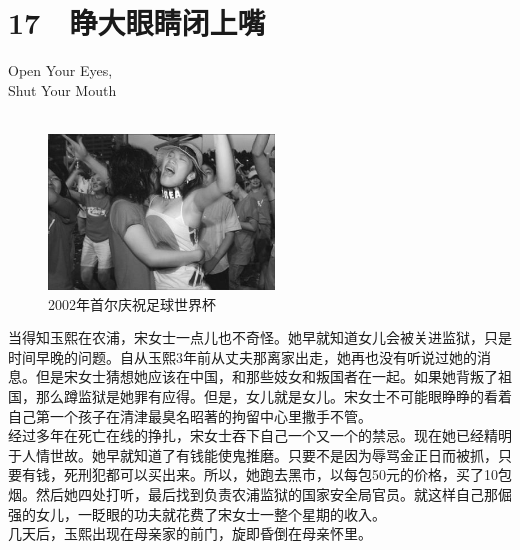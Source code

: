 \fancyhead[RO]{{\tiny{\textcolor{Gray}{\FA \ }}}\thepage}
\fancyhead[LE]{{\tiny{\textcolor{Gray}{\FA \ }}}\thepage}
\fancyfoot[LE,RO]{}
\fancyfoot[LO,CE]{}
\fancyfoot[CO,RE]{}
\chapter*{17 {\FA } 睁大眼睛闭上嘴}
\begin{flushright}
	\textcolor{PinYinColor}{\EN \huge{Open Your Eyes,\\
	Shut Your Mouth\\
	\ \\}}
\end{flushright}
\begin{figure}[!htbp]
\centering
\includegraphics[width=6cm]{./Chapters/Images/17.jpg}
\caption*{2002年首尔庆祝足球世界杯}
\end{figure}


当得知玉熙在农浦，宋女士一点儿也不奇怪。她早就知道女儿会被关进监狱，只是时间早晚的问题。自从玉熙3年前从丈夫那离家出走，她再也没有听说过她的消息。但是宋女士猜想她应该在中国，和那些妓女和叛国者在一起。如果她背叛了祖国，那么蹲监狱是她罪有应得。但是，女儿就是女儿。宋女士不可能眼睁睁的看着自己第一个孩子在清津最臭名昭著的拘留中心里撒手不管。\\

经过多年在死亡在线的挣扎，宋女士吞下自己一个又一个的禁忌。现在她已经精明于人情世故。她早就知道了有钱能使鬼推磨。只要不是因为辱骂金正日而被抓，只要有钱，死刑犯都可以买出来。所以，她跑去黑市，以每包50元的价格，买了10包烟。然后她四处打听，最后找到负责农浦监狱的国家安全局官员。就这样自己那倔强的女儿，一眨眼的功夫就花费了宋女士一整个星期的收入。\\

几天后，玉熙出现在母亲家的前门，旋即昏倒在母亲怀里。\\

